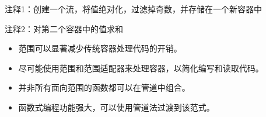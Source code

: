{\footnotesize
注释1：创建一个流，将值绝对化，过滤掉奇数，并存储在一个新容器中

注释2：对第二个容器中的值求和
}


\begin{itemize}
\item
范围可以显著减少传统容器处理代码的开销。

\item
尽可能使用范围和范围适配器来处理容器，以简化编写和读取代码。

\item
并非所有面向范围的函数都可以在管道中组合。

\item
函数式编程功能强大，可以使用管道法过渡到该范式。
\end{itemize}










